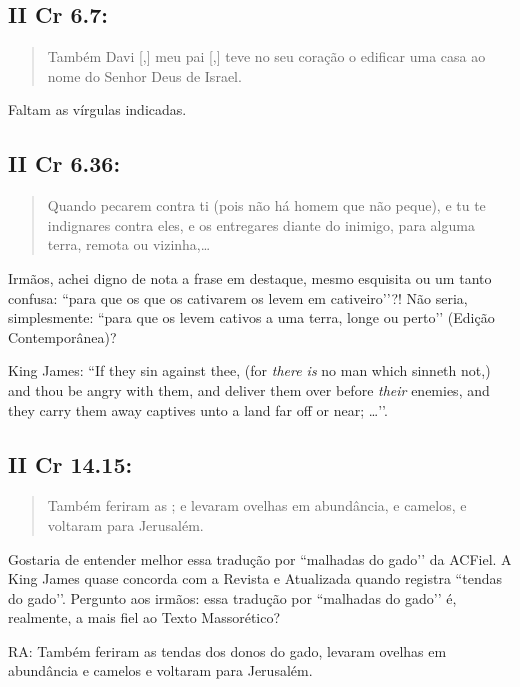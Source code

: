 \subsection*{II Cr 6.7:} 
\begin{quote}
    \small
Também Davi [,] meu pai [,] teve no seu coração o edificar uma casa ao nome do Senhor Deus de Israel.
 \end{quote}
 
Faltam as vírgulas indicadas.

\subsection*{II Cr 6.36:} 
\begin{quote}
    \small
Quando pecarem contra ti (pois não há homem que não peque), e tu te indignares contra eles, e os entregares diante do inimigo,  para alguma terra, remota ou vizinha,\ldots
 \end{quote}
 
Irmãos, achei digno de nota a frase em destaque, mesmo esquisita ou um
tanto confusa: ``para que os que os cativarem os levem em
cativeiro’’?! Não seria, simplesmente: ``para que os levem cativos a
uma terra, longe ou perto’’ (Edição Contemporânea)?

King James: ``If they sin against thee, (for \emph{there is} no man which sinneth not,) and thou be angry with them, and deliver them over before \emph{their} enemies, and they carry them away captives unto a land far off or near; \ldots’’.

\subsection*{II Cr 14.15:} 
\begin{quote}
    \small
 Também feriram as ; e levaram ovelhas em abundância, e camelos, e voltaram para Jerusalém.
 \end{quote}

Gostaria de entender melhor essa tradução por ``malhadas do gado’’ da ACFiel. A King James quase concorda com a Revista e Atualizada quando registra ``tendas do gado’’. Pergunto aos irmãos: essa tradução por ``malhadas do gado’’ é, realmente, a mais fiel ao Texto Massorético?

RA: Também feriram as tendas dos donos do gado, levaram ovelhas em abundância e camelos e voltaram para Jerusalém.

